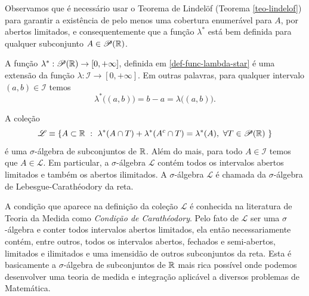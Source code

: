         Observamos que é necessário usar o Teorema de Lindel\"of (Teorema \ref{teo-lindelof})
        para garantir a existência de pelo menos uma cobertura enumerável 
        para $A$, por abertos limitados, e consequentemente que a função 
        $\lambda^*$ está bem definida para qualquer subconjunto $A\in\mathscr{P}(\mathbb{R})$.
        \begin{teorema}
            A função $\lambda^{*}:\mathscr{P}(\mathbb{R})\to [0,+\infty]$, 
            definida em \eqref{def-func-lambda-star} 
            é uma extensão da função $\lambda:\mathcal{I}\to [0,+\infty]$.
            Em outras palavras, para qualquer intervalo $(a,b)\in \mathcal{I}$
            temos
            \[\lambda^*\big((a,b)\big) = b-a = \lambda\big((a,b)\big).\]
        \end{teorema}
        \begin{teorema}
        \label{teo-leb-carath}
            A coleção 
            \[
                \mathscr{L}
                \equiv 
                \{ 
                    A\subset \R \ : \   
                    \lambda^{*}(A\cap T)+\lambda^{*}(A^c\cap T) = \lambda^{*}(A)
                    ,\  \forall T\in\mathscr{P}(\R) \ 
                \}
            \]
            é uma $\sigma$-álgebra de subconjuntos de $\mathbb{R}$. 
            Além do mais, para todo $A\in\mathcal{I}$ temos que $A\in \mathscr{L}$.
            Em particular, a $\sigma$-álgebra $\mathscr{L}$ 
            contém todos os intervalos abertos limitados e também os abertos ilimitados. 
            A $\sigma$-álgebra $\mathscr{L}$ é chamada da $\sigma$-álgebra
            de Lebesgue-Carathéodory da reta.
        \end{teorema}
        A condição que aparece na definição da coleção $\mathscr{L}$ é
        conhecida na literatura de Teoria da Medida como {\it Condição de 
        Carathéodory}. 
        Pelo fato de $\mathscr{L}$ ser uma $\sigma$-álgebra e conter todos intervalos abertos limitados, 
        ela então necessariamente contém, entre outros, 
        todos os intervalos abertos, fechados e semi-abertos, 
        limitados e ilimitados e uma imensidão de outros subconjuntos da reta. 
        Esta é basicamente a $\sigma$-álgebra de subconjuntos
        de $\mathbb{R}$ mais rica possível onde podemos desenvolver uma 
        teoria de medida e integração aplicável a diversos problemas de Matemática. 
